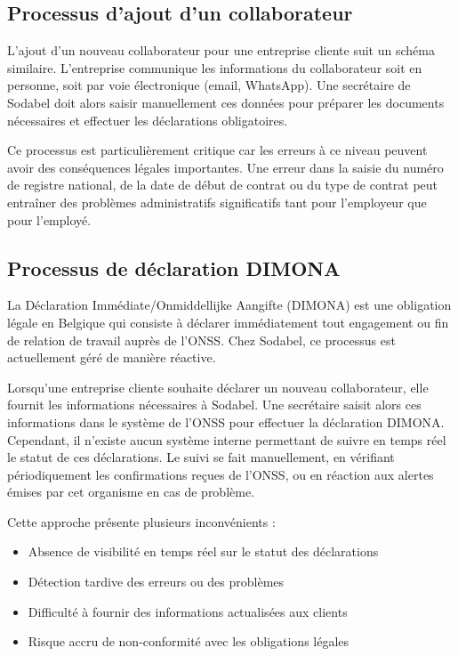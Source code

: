 \documentclass[12pt,a4paper]{report}
\begin{document}
\subsection{Processus d'ajout d'un collaborateur}

L'ajout d'un nouveau collaborateur pour une entreprise cliente suit un schéma similaire. L'entreprise communique les informations du collaborateur soit en personne, soit par voie électronique (email, WhatsApp). Une secrétaire de Sodabel doit alors saisir manuellement ces données pour préparer les documents nécessaires et effectuer les déclarations obligatoires.

Ce processus est particulièrement critique car les erreurs à ce niveau peuvent avoir des conséquences légales importantes. Une erreur dans la saisie du numéro de registre national, de la date de début de contrat ou du type de contrat peut entraîner des problèmes administratifs significatifs tant pour l'employeur que pour l'employé.

\subsection{Processus de déclaration DIMONA}

La Déclaration Immédiate/Onmiddellijke Aangifte (DIMONA) est une obligation légale en Belgique qui consiste à déclarer immédiatement tout engagement ou fin de relation de travail auprès de l'ONSS. Chez Sodabel, ce processus est actuellement géré de manière réactive.

Lorsqu'une entreprise cliente souhaite déclarer un nouveau collaborateur, elle fournit les informations nécessaires à Sodabel. Une secrétaire saisit alors ces informations dans le système de l'ONSS pour effectuer la déclaration DIMONA. Cependant, il n'existe aucun système interne permettant de suivre en temps réel le statut de ces déclarations. Le suivi se fait manuellement, en vérifiant périodiquement les confirmations reçues de l'ONSS, ou en réaction aux alertes émises par cet organisme en cas de problème.

Cette approche présente plusieurs inconvénients :
\begin{itemize}
  \item Absence de visibilité en temps réel sur le statut des déclarations
  \item Détection tardive des erreurs ou des problèmes
  \item Difficulté à fournir des informations actualisées aux clients
  \item Risque accru de non-conformité avec les obligations légales
\end{itemize}
\end{document}
